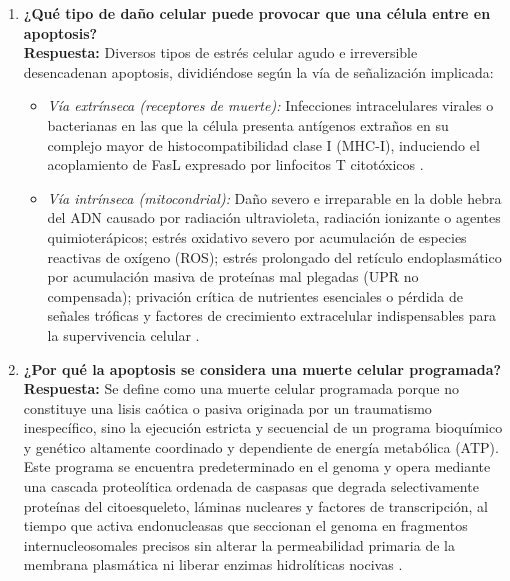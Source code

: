 \documentclass[spanish,letterpaper,oneside]{article}
\begin{document}
\begin{enumerate}[label=\textbf{\arabic*.}]
	\item \textbf{¿Qué tipo de daño celular puede provocar que una célula entre en apoptosis?}\\
	\textbf{Respuesta:} Diversos tipos de estrés celular agudo e irreversible desencadenan apoptosis, dividiéndose según la vía de señalización implicada:
	\begin{itemize}[leftmargin=1.5em,itemsep=0.15em]
		\item \emph{Vía extrínseca (receptores de muerte):} Infecciones intracelulares virales o bacterianas en las que la célula presenta antígenos extraños en su complejo mayor de histocompatibilidad clase I (MHC-I), induciendo el acoplamiento de FasL expresado por linfocitos T citotóxicos \parencite{caulfield2014disruption}.
		\item \emph{Vía intrínseca (mitocondrial):} Daño severo e irreparable en la doble hebra del ADN causado por radiación ultravioleta, radiación ionizante o agentes quimioterápicos; estrés oxidativo severo por acumulación de especies reactivas de oxígeno (ROS); estrés prolongado del retículo endoplasmático por acumulación masiva de proteínas mal plegadas (UPR no compensada); privación crítica de nutrientes esenciales o pérdida de señales tróficas y factores de crecimiento extracelular indispensables para la supervivencia celular \parencite{strasser2009many,lodish2021molecular}.
	\end{itemize}

	\item \textbf{¿Por qué la apoptosis se considera una muerte celular programada?}\\
	\textbf{Respuesta:} Se define como una muerte celular programada porque no constituye una lisis caótica o pasiva originada por un traumatismo inespecífico, sino la ejecución estricta y secuencial de un programa bioquímico y genético altamente coordinado y dependiente de energía metabólica (ATP). Este programa se encuentra predeterminado en el genoma y opera mediante una cascada proteolítica ordenada de caspasas que degrada selectivamente proteínas del citoesqueleto, láminas nucleares y factores de transcripción, al tiempo que activa endonucleasas que seccionan el genoma en fragmentos internucleosomales precisos sin alterar la permeabilidad primaria de la membrana plasmática ni liberar enzimas hidrolíticas nocivas \parencite{wajant2002fasl,alberts2022molecular}.


\end{enumerate}
\end{document}
